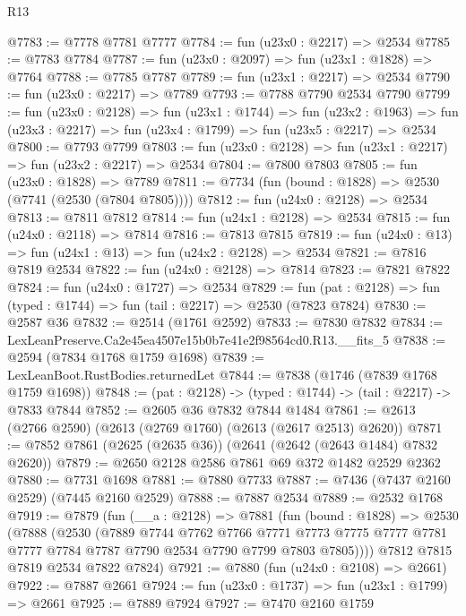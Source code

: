 \begin{lexlean}{R13}
\begin{coremodule}
@7783 := @7778 @7781 @7777
@7784 := fun (u23x0 : @2217) => @2534
@7785 := @7783 @7784
@7787 := fun (u23x0 : @2097) => fun (u23x1 : @1828) => @7764
@7788 := @7785 @7787
@7789 := fun (u23x1 : @2217) => @2534
@7790 := fun (u23x0 : @2217) => @7789
@7793 := @7788 @7790 @2534 @7790
@7799 := fun (u23x0 : @2128) =>
  fun (u23x1 : @1744) =>
  fun (u23x2 : @1963) => fun (u23x3 : @2217) => fun (u23x4 : @1799) => fun (u23x5 : @2217) => @2534
@7800 := @7793 @7799
@7803 := fun (u23x0 : @2128) => fun (u23x1 : @2217) => fun (u23x2 : @2217) => @2534
@7804 := @7800 @7803
@7805 := fun (u23x0 : @1828) => @7789
@7811 := @7734 (fun (bound : @1828) => @2530 (@7741 (@2530 (@7804 @7805))))
@7812 := fun (u24x0 : @2128) => @2534
@7813 := @7811 @7812
@7814 := fun (u24x1 : @2128) => @2534
@7815 := fun (u24x0 : @2118) => @7814
@7816 := @7813 @7815
@7819 := fun (u24x0 : @13) => fun (u24x1 : @13) => fun (u24x2 : @2128) => @2534
@7821 := @7816 @7819 @2534
@7822 := fun (u24x0 : @2128) => @7814
@7823 := @7821 @7822
@7824 := fun (u24x0 : @1727) => @2534
@7829 := fun (pat : @2128) => fun (typed : @1744) => fun (tail : @2217) => @2530 (@7823 @7824)
@7830 := @2587 @36
@7832 := @2514 (@1761 @2592)
@7833 := @7830 @7832
@7834 := LexLeanPreserve.Ca2e45ea4507e15b0b7e41e2f98564cd0.R13.__fits_5
@7838 := @2594 (@7834 @1768 @1759 @1698)
@7839 := LexLeanBoot.RustBodies.returnedLet
@7844 := @7838 (@1746 (@7839 @1768 @1759 @1698))
@7848 := (pat : @2128) -> (typed : @1744) -> (tail : @2217) -> @7833 @7844
@7852 := @2605 @36 @7832 @7844 @1484
@7861 := @2613 (@2766 @2590) (@2613 (@2769 @1760) (@2613 (@2617 @2513) @2620))
@7871 := @7852 @7861 (@2625 (@2635 @36)) (@2641 (@2642 (@2643 @1484) @7832 @2620))
@7879 := @2650 @2128 @2586 @7861 @69 @372 @1482 @2529 @2362
@7880 := @7731 @1698
@7881 := @7880 @7733
@7887 := @7436 (@7437 @2160 @2529) (@7445 @2160 @2529)
@7888 := @7887 @2534
@7889 := @2532 @1768
@7919 := @7879
    (fun (__a : @2128) =>
    @7881
      (fun (bound : @1828) =>
      @2530
        (@7888
          (@2530
            (@7889
              @7744
              @7762
              @7766
              @7771
              @7773
              @7775
              @7777
              @7781
              @7777
              @7784
              @7787
              @7790
              @2534
              @7790
              @7799
              @7803
              @7805))))
      @7812
      @7815
      @7819
      @2534
      @7822
      @7824)
@7921 := @7880 (fun (u24x0 : @2108) => @2661)
@7922 := @7887 @2661
@7924 := fun (u23x0 : @1737) => fun (u23x1 : @1799) => @2661
@7925 := @7889 @7924
@7927 := @7470 @2160 @1759

\end{coremodule}
\end{lexlean}
